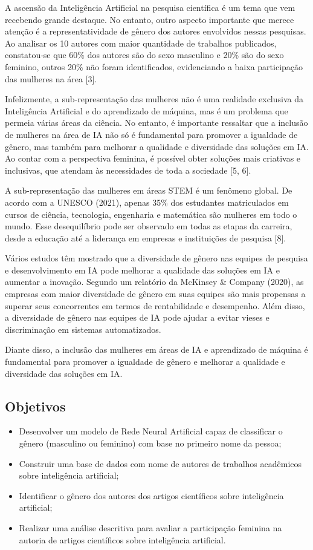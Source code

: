 \documentclass[conference,compsoc]{IEEEtran}
\begin{document}
A ascensão da Inteligência Artificial na pesquisa científica é um tema que vem recebendo grande destaque. No entanto, outro aspecto importante que merece atenção é a representatividade de gênero dos autores envolvidos nessas pesquisas. Ao analisar os 10 autores com maior quantidade de trabalhos publicados, constatou-se que 60\% dos autores são do sexo masculino e 20\% são do sexo feminino, outros 20\% não foram identificados, evidenciando a baixa participação das mulheres na área [3].

Infelizmente, a sub-representação das mulheres não é uma realidade exclusiva da Inteligência Artificial e do aprendizado de máquina, mas é um problema que permeia várias áreas da ciência. No entanto, é importante ressaltar que a inclusão de mulheres na área de IA não só é fundamental para promover a igualdade de gênero, mas também para melhorar a qualidade e diversidade das soluções em IA. Ao contar com a perspectiva feminina, é possível obter soluções mais criativas e inclusivas, que atendam às necessidades de toda a sociedade [5, 6].

A sub-representação das mulheres em áreas STEM é um fenômeno global. De acordo com a UNESCO (2021), apenas 35\% dos estudantes matriculados em cursos de ciência, tecnologia, engenharia e matemática são mulheres em todo o mundo. Esse desequilíbrio pode ser observado em todas as etapas da carreira, desde a educação até a liderança em empresas e instituições de pesquisa [8].

Vários estudos têm mostrado que a diversidade de gênero nas equipes de pesquisa e desenvolvimento em IA pode melhorar a qualidade das soluções em IA e aumentar a inovação. Segundo um relatório da McKinsey & Company (2020), as empresas com maior diversidade de gênero em suas equipes são mais propensas a superar seus concorrentes em termos de rentabilidade e desempenho. Além disso, a diversidade de gênero nas equipes de IA pode ajudar a evitar vieses e discriminação em sistemas automatizados.

Diante disso, a inclusão das mulheres em áreas de IA e aprendizado de máquina é fundamental para promover a igualdade de gênero e melhorar a qualidade e diversidade das soluções em IA.




\subsection{Objetivos}
\begin{itemize}
    \item Desenvolver um modelo de Rede Neural Artificial capaz de classificar o gênero (masculino ou feminino) com base no primeiro nome da pessoa;
    \item Construir uma base de dados com nome de autores de trabalhos acadêmicos sobre inteligência artificial;
    \item Identificar o gênero dos autores dos artigos científicos sobre inteligência artificial;
    \item Realizar uma análise descritiva para avaliar a participação feminina na autoria de artigos científicos sobre inteligência artificial.
\end{itemize}
\end{document}
